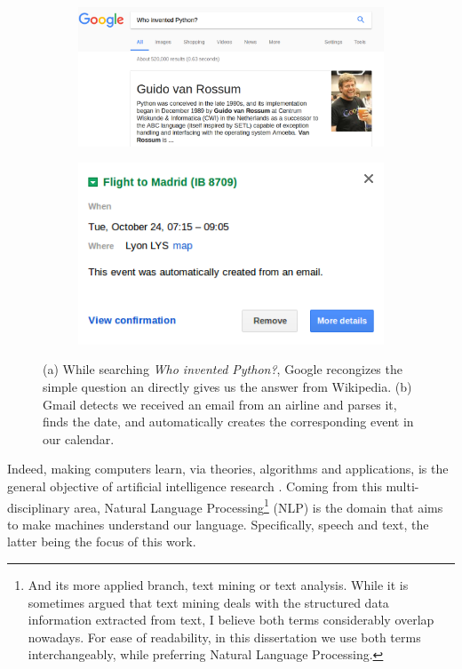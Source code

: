 \begin{figure}[t]
\centering
	\begin{subfigure}[b]{0.55\textwidth}
	\includegraphics[width=1\linewidth]{./images/Chapitre1/guido_google.png}
	\caption{}
\end{subfigure}

	\begin{subfigure}[b]{0.55\textwidth}
	\includegraphics[width=1\linewidth]{./images/Chapitre1/calendar2.png}
	\caption{}
\end{subfigure}
\caption[foo]{(a) While searching \textit{Who invented Python?}, Google recongizes the simple question an directly gives us the answer from Wikipedia. (b) Gmail detects we received an email from an airline and parses it, finds the date, and automatically creates the corresponding event in our calendar.}	
\label{fig:google_nlp}
\end{figure}
%
Indeed, making computers learn,  via theories, algorithms and applications, is the general objective of artificial intelligence research \cite{Sugiyama2015}. Coming from this multi-disciplinary area, Natural Language Processing\footnote{And its more applied branch, text mining or text analysis. While it is sometimes argued that text mining deals with the structured data information extracted from text, I believe both terms considerably overlap nowadays. For ease of readability, in this dissertation we use both terms interchangeably, while preferring Natural Language Processing.} (NLP) is the domain that aims to make machines understand our language\cite{JurafskyM09}. Specifically, speech and text, the latter being the focus of this work.

